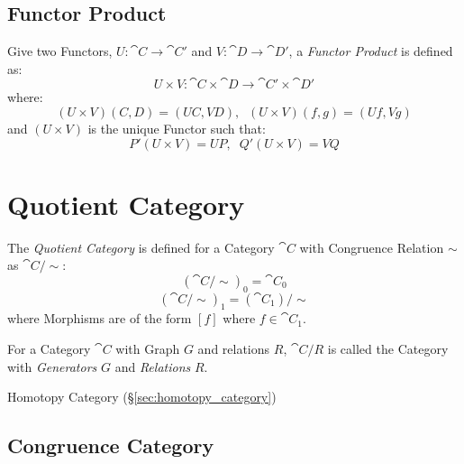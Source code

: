 \subsection{Functor Product}\label{sec:functor_product}

Give two Functors, $U : \cat{C} \rightarrow \cat{C'}$ and $V :
\cat{D} \rightarrow \cat{D'}$, a \emph{Functor Product} is
defined as:
\[
  U \times V : \cat{C} \times \cat{D}
  \rightarrow \cat{C'} \times \cat{D'}
\]
where:
\[
  (U \times V)(C,D) = (UC,VD), \;\; (U \times V)(f,g) = (Uf,Vg)
\]
and $(U \times V)$ is the unique Functor such that:
\[
  P'(U \times V) = UP, \;\; Q'(U \times V) = VQ
\]



\section{Quotient Category}\label{sec:quotient_category}


The \emph{Quotient Category} is defined for a Category $\cat{C}$
with Congruence Relation $\sim$ as $\cat{C}/\sim$:
\[
  (\cat{C}/\sim)_0 = \cat{C_0}
\]\[
  (\cat{C}/\sim)_1 = (\cat{C_1})/\sim
\]
where Morphisms are of the form $[f]$ where $f \in \cat{C_1}$.

For a Category $\cat{C}$ with Graph $G$ and relations $R$,
$\cat{C}/R$ is called the Category with \emph{Generators} $G$ and
\emph{Relations} $R$.

Homotopy Category (\S\ref{sec:homotopy_category})



\subsection{Congruence Category}\label{sec:congruence_category}

